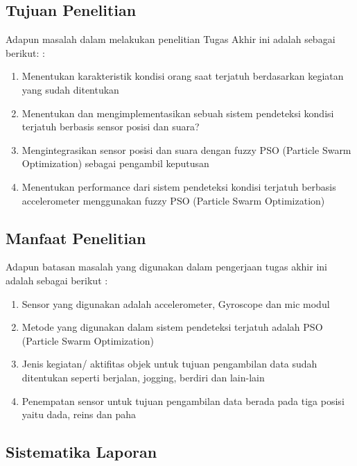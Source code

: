 \documentclass[11pt]{article}
\numberwithin{equation}{subsection}
\begin{document}
	
	
	\subsection{Tujuan Penelitian}
	
		Adapun masalah dalam melakukan penelitian Tugas Akhir ini adalah sebagai berikut: :
	
	\begin{enumerate}[label=\alph*.]
		\item Menentukan karakteristik kondisi orang saat terjatuh berdasarkan kegiatan yang sudah ditentukan
		\item Menentukan dan mengimplementasikan sebuah sistem pendeteksi kondisi terjatuh berbasis sensor posisi dan suara?
		\item Mengintegrasikan sensor posisi dan suara dengan fuzzy PSO (Particle Swarm Optimization) sebagai pengambil keputusan
		\item Menentukan performance dari sistem pendeteksi kondisi terjatuh berbasis accelerometer menggunakan fuzzy PSO (Particle Swarm Optimization)
		
	\end{enumerate}
	
	
	\subsection{Manfaat Penelitian}
	
Adapun batasan masalah yang digunakan dalam pengerjaan tugas akhir ini adalah sebagai berikut :
	
	\begin{enumerate}[label=\alph*.]
		
		\item Sensor yang digunakan adalah accelerometer, Gyroscope dan mic modul
		\item Metode yang digunakan dalam sistem pendeteksi terjatuh adalah PSO (Particle Swarm Optimization)
		\item Jenis kegiatan/ aktifitas objek untuk tujuan pengambilan data sudah ditentukan seperti berjalan, jogging, berdiri dan lain-lain
		\item Penempatan sensor untuk tujuan pengambilan data berada pada tiga posisi yaitu dada, reins dan paha
		
	\end{enumerate}

	\subsection{Sistematika Laporan}
\end{document}
